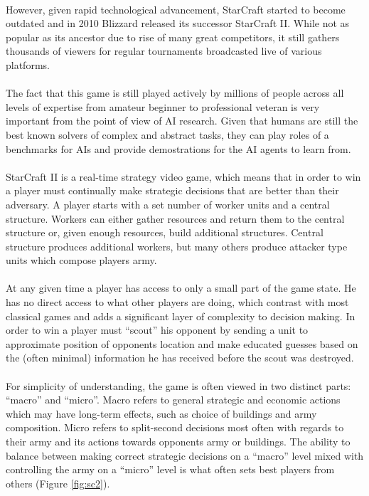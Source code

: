 
\noindent \\ However, given rapid technological advancement, StarCraft started to become outdated and in 2010 Blizzard released its successor StarCraft II. While not as popular as its ancestor due to rise of many great competitors, it still gathers thousands of viewers for regular tournaments broadcasted live of various platforms.
\\\\
The fact that this game is still played actively by millions of people across all levels of expertise from amateur beginner to professional veteran is very important from the point of view of AI research. Given that humans are still the best known solvers of complex and abstract tasks, they can play roles of a benchmarks for AIs and provide demostrations for the AI agents to learn from.
\\\\
StarCraft II is a real-time strategy video game, which means that in order to win a player must continually make strategic decisions that are better than their adversary. A player starts with a set number of worker units and a central structure. Workers can either gather resources and return them to the central structure or, given enough resources, build additional structures. Central structure produces additional workers, but many others produce attacker type units which compose players army.
\\\\
At any given time a player has access to only a small part of the game state. He has no direct access to what other players are doing, which contrast with most classical games and adds a significant layer of complexity to decision making. In order to win a player must “scout” his opponent by sending a unit to approximate position of opponents location and make educated guesses based on the (often minimal) information he has received before the scout was destroyed.
\\\\
For simplicity of understanding, the game is often viewed in two distinct parts: “macro” and “micro”. Macro refers to general strategic and economic actions which may have long-term effects, such as choice of buildings and army composition. Micro refers to split-second decisions most often with regards to their army and its actions towards opponents army or buildings. The ability to balance between making correct strategic decisions on a “macro” level mixed with controlling the army on a “micro” level is what often sets best players from others (Figure \ref{fig:sc2}).

